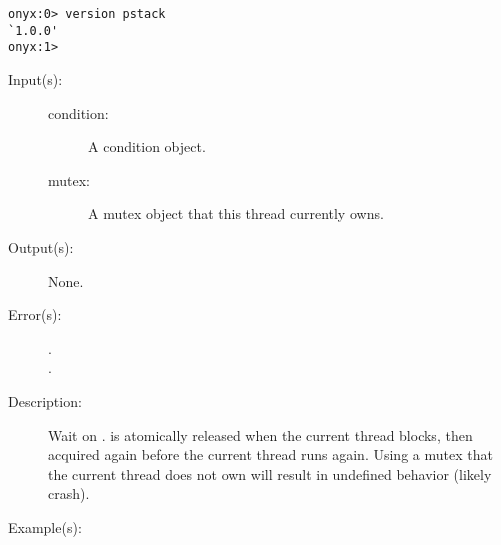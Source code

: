\begin{description}
\begin{description}
\begin{verbatim}
onyx:0> version pstack
`1.0.0'
onyx:1>
		\end{verbatim}
	\end{description}
\label{systemdict:wait}
\item[{\onyxop{condition mutex}{wait}{--}}: ]
	\begin{description}\item[]
	\item[Input(s): ]
		\begin{description}\item[]
		\item[condition: ]
			A condition object.
		\item[mutex: ]
			A mutex object that this thread currently owns.
		\end{description}
	\item[Output(s): ] None.
	\item[Error(s): ]
		\begin{description}\item[]
		\item[.]
		\item[.]
		\end{description}
	\item[Description: ]
		Wait on .   is atomically released
		when the current thread blocks, then acquired again before the
		current thread runs again.  Using a mutex that the current
		thread does not own will result in undefined behavior (likely
		crash).
	\item[Example(s): ]\begin{verbatim}


\end{verbatim}
\end{description}
\end{description}
